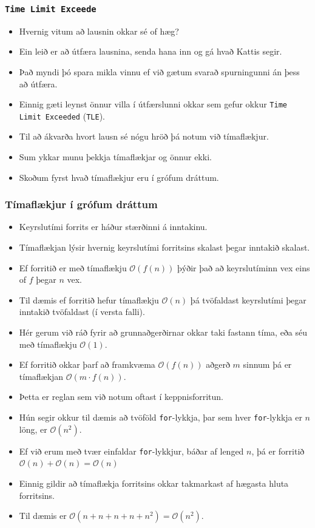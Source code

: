 \documentclass{beamer}
\newcommand\env[2]
{
	\begin{#1}
	#2
	\end{#1}
}
\begin{document}
\env{frame}
{
	\frametitle{\texttt{Time Limit Exceede}}
	\env{itemize}
	{
		\item<1-> Hvernig vitum að lausnin okkar sé of hæg?
		\item<2-> Ein leið er að útfæra lausnina, senda hana inn og gá hvað Kattis segir.
		\item<3-> Það myndi þó spara mikla vinnu ef við gætum svarað spurningunni án þess að útfæra.
		\item<4-> Einnig gæti leynst önnur villa í útfærslunni okkar sem gefur okkur \texttt{Time Limit Exceeded} (\texttt{TLE}).
		\item<5-> Til að ákvarða hvort lausn sé nógu hröð þá notum við tímaflækjur.
		\item<6-> Sum ykkar munu þekkja tímaflækjar og önnur ekki.
		\item<7-> Skoðum fyrst hvað tímaflækjur eru í grófum dráttum.
	}
}

\env{frame}
{
	\frametitle{Tímaflækjur í grófum dráttum}
	\env{itemize}
	{
		\item<1-> Keyrslutími forrits er háður stærðinni á inntakinu.
		\item<2-> Tímaflækjan lýsir hvernig keyrslutími forritsins skalast þegar inntakið skalast.
		\item<3-> Ef forritið er með tímaflækju $\mathcal{O}(f(n))$ þýðir það að keyrslutíminn vex eins of $f$ þegar $n$ vex.
		\item<4-> Til dæmis ef forritið hefur tímaflækju $\mathcal{O}(n)$ þá tvöfaldast keyrslutími þegar inntakið tvöfaldast (í versta falli).
		\item<5-> Hér gerum við ráð fyrir að grunnaðgerðirnar okkar taki fastann tíma, eða séu með tímaflækju $\mathcal{O}(1)$.
	}
}

\env{frame}
{
	\env{itemize}
	{
		\item<1-> Ef forritið okkar þarf að framkvæma $\mathcal{O}(f(n))$ aðgerð $m$ sinnum þá er tímaflækjan $\mathcal{O}(m \cdot f(n))$.
		\item<2-> Þetta er reglan sem við notum oftast í keppnisforritun.
		\item<3-> Hún segir okkur til dæmis að tvöföld \texttt{for}-lykkja, þar sem hver \texttt{for}-lykkja er $n$ löng, er $\mathcal{O}(n^2)$.
		\item<4-> Ef við erum með tvær einfaldar \texttt{for}-lykkjur, báðar af lenged $n$, þá er forritið 
			$\mathcal{O}(n) + \mathcal{O}(n) = \mathcal{O}(n)$
		\item<5-> Einnig gildir að tímaflækja forritsins okkar takmarkast af hægasta hluta forritsins.
		\item<6-> Til dæmis er
			$\mathcal{O}(n + n + n + n + n^2) = \mathcal{O}(n^2)$.
	}
}
\end{document}
